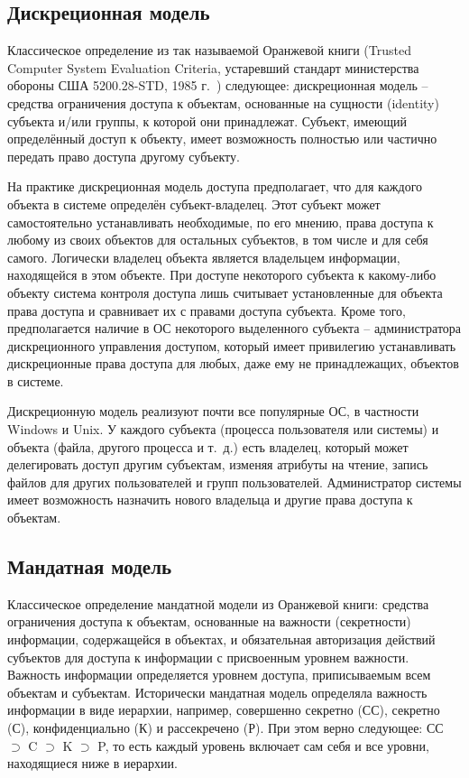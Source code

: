 \subsection{Дискреционная модель}

Классическое определение из так называемой Оранжевой книги (Trusted Computer System Evaluation Criteria, устаревший стандарт министерства обороны США 5200.28-STD, 1985 г.~\cite{DOD-5200.28-STD}) следующее: дискреционная модель -- средства ограничения доступа к объектам, основанные на сущности (identity) субъекта и/или группы, к которой они принадлежат. Субъект, имеющий определённый доступ к объекту, имеет возможность полностью или частично передать право доступа другому субъекту.

На практике дискреционная модель доступа предполагает, что для каждого объекта в системе определён субъект-владелец. Этот субъект может самостоятельно устанавливать необходимые, по его мнению, права доступа к любому из своих объектов для остальных субъектов, в том числе и для себя самого. Логически владелец объекта является владельцем информации, находящейся в этом объекте. При доступе некоторого субъекта к какому-либо объекту система контроля доступа лишь считывает установленные для объекта права доступа и сравнивает их с правами доступа субъекта. Кроме того, предполагается наличие в ОС некоторого выделенного субъекта -- администратора дискреционного управления доступом, который имеет привилегию устанавливать дискреционные права доступа для любых, даже ему не принадлежащих, объектов в системе.

Дискреционную модель реализуют почти все популярные ОС, в частности Windows и Unix. У каждого субъекта (процесса пользователя или системы) и объекта (файла, другого процесса и т.~д.) есть владелец, который может делегировать доступ другим субъектам, изменяя атрибуты на чтение, запись файлов для других пользователей и групп пользователей. Администратор системы имеет возможность назначить нового владельца и другие права доступа к объектам.


\subsection{Мандатная модель}

Классическое определение мандатной модели из Оранжевой книги: средства ограничения доступа к объектам, основанные на важности (секретности) информации, содержащейся в объектах, и обязательная авторизация действий субъектов для доступа к информации с присвоенным уровнем важности. Важность информации определяется уровнем доступа, приписываемым всем объектам и субъектам. Исторически мандатная модель определяла важность информации в виде иерархии, например, совершенно секретно (СС), секретно (С), конфиденциально (К) и рассекречено (Р). При этом верно следующее: СС $\supset$ C $\supset$ K $\supset$ P, то есть каждый уровень включает сам себя и все уровни, находящиеся ниже в иерархии.

